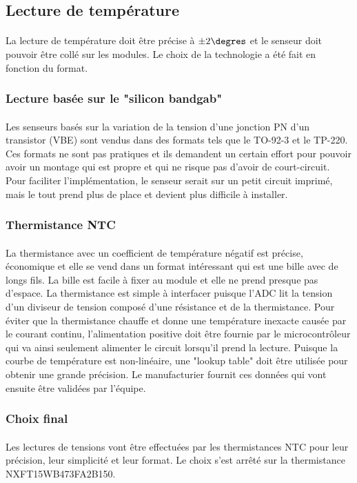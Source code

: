 

\subsection{Lecture de température}
	\paragraph*{}
	La lecture de température doit être précise à $\pm 2\degres$ et le senseur doit pouvoir être collé sur les modules. Le choix de la technologie a été fait en fonction du format.

	\subsubsection*{Lecture basée sur le "silicon bandgab"}
	\paragraph*{}
	Les senseurs basés sur la variation de la tension d'une jonction PN d'un transistor (VBE) sont vendus dans des formats tels que le TO-92-3 et le TP-220. Ces formats ne sont pas pratiques et ils demandent un certain effort pour pouvoir avoir un montage qui est propre et qui ne risque pas d'avoir de court-circuit. Pour faciliter l'implémentation, le senseur serait sur un petit circuit imprimé, mais le tout prend plus de place et devient plus difficile à installer.

	\subsubsection*{Thermistance NTC}
	\paragraph*{}
	La thermistance avec un coefficient de température négatif est précise, économique et elle se vend dans un format intéressant qui est une bille avec de longs fils. La bille est facile à fixer au module et elle ne prend presque pas d'espace. La thermistance est simple à interfacer puisque l'ADC lit la tension d'un diviseur de tension composé d'une résistance et de la thermistance. Pour éviter que la thermistance chauffe et donne une température inexacte causée par le courant continu, l'alimentation positive doit être fournie par le microcontrôleur qui va ainsi seulement alimenter le circuit lorsqu'il prend la lecture. Puisque la courbe de température est non-linéaire, une "lookup table" doit être utilisée pour obtenir une grande précision. Le manufacturier fournit ces données qui vont ensuite être validées par l'équipe.

	\subsubsection*{Choix final}
	\paragraph*{}
	Les lectures de tensions vont être effectuées par les thermistances NTC pour leur précision, leur simplicité et leur format. Le choix s'est arrêté sur la thermistance NXFT15WB473FA2B150.